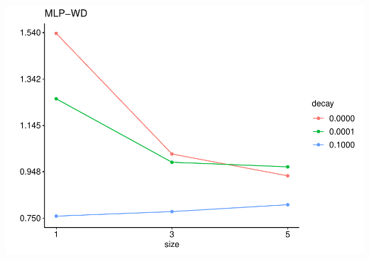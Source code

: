 \documentclass[
]{article}
\begin{document}
\includegraphics{sl-inf-cairs-2301_files/figure-latex/optResults-5.pdf}
\end{document}

